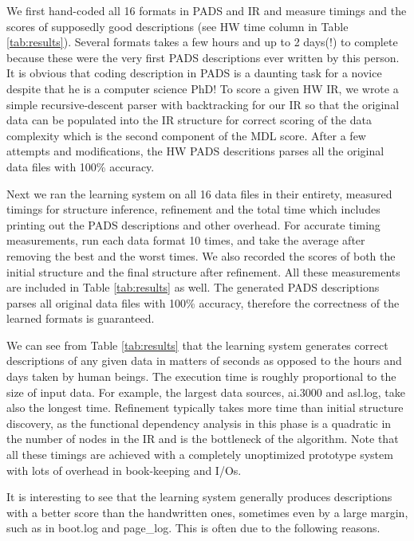 We first hand-coded all 16 formats in PADS and IR and measure timings and the scores 
of supposedly good descriptions (see HW time column in Table \ref{tab:results}). 
Several formats takes a few hours and up to 2 days(!) to complete because these were the very first 
PADS descriptions ever written by this person. It is obvious that coding description
in PADS is a daunting task for a novice despite that he is a computer science PhD!
To score a given HW IR, we wrote a simple recursive-descent parser with backtracking
for our IR so that the original data can be populated into the IR structure for
correct scoring of the data complexity which is the second component of the MDL score.
After a few attempts and modifications, the HW PADS descritions parses all 
the original data files with 100\% accuracy.

Next we ran the learning system on all 16 data files in their entirety, 
measured timings for structure inference, refinement and the total time which includes
printing out the PADS descriptions and other overhead. 
For accurate timing measurements, run each data format 10 times, and take the average 
after removing the best and the worst times.
We also recorded the scores of both the initial structure and the final structure after refinement.
All these measurements are included in Table \ref{tab:results} as well.
The generated PADS descriptions parses all original data files with 100\% accuracy,
therefore the correctness of the learned formats is guaranteed.

We can see from Table \ref{tab:results} that the learning system
generates correct descriptions of any given data in matters of seconds as opposed to
the hours and days taken by human beings. The execution time is roughly proportional
to the size of input data. For example, the largest data sources, ai.3000 and asl.log,
take also the longest time. Refinement typically takes more time than initial
structure discovery, as the functional dependency analysis in this phase is a quadratic
in the number of nodes in the IR and is the bottleneck of the algorithm. 
Note that all these timings are achieved with a completely unoptimized prototype system
with lots of overhead in book-keeping and I/Os.

It is interesting to see that the learning system generally produces descriptions
with a better score than the handwritten ones, sometimes even by a large margin, such
as in boot.log and page\_log. This is often due to the following reasons.

